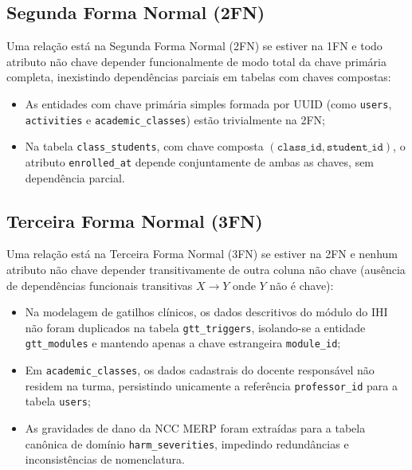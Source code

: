 \subsection{Segunda Forma Normal (2FN)}
Uma relação está na Segunda Forma Normal (2FN) se estiver na 1FN e todo atributo não chave depender funcionalmente de modo total da chave primária completa, inexistindo dependências parciais em tabelas com chaves compostas:
\begin{itemize}
    \item As entidades com chave primária simples formada por UUID (como \texttt{users}, \texttt{activities} e \texttt{academic\_classes}) estão trivialmente na 2FN;
    \item Na tabela \texttt{class\_students}, com chave composta $(\texttt{class\_id}, \texttt{student\_id})$, o atributo \texttt{enrolled\_at} depende conjuntamente de ambas as chaves, sem dependência parcial.
\end{itemize}

\subsection{Terceira Forma Normal (3FN)}
Uma relação está na Terceira Forma Normal (3FN) se estiver na 2FN e nenhum atributo não chave depender transitivamente de outra coluna não chave (ausência de dependências funcionais transitivas $X \rightarrow Y$ onde $Y$ não é chave):
\begin{itemize}
    \item Na modelagem de gatilhos clínicos, os dados descritivos do módulo do IHI não foram duplicados na tabela \texttt{gtt\_triggers}, isolando-se a entidade \texttt{gtt\_modules} e mantendo apenas a chave estrangeira \texttt{module\_id};
    \item Em \texttt{academic\_classes}, os dados cadastrais do docente responsável não residem na turma, persistindo unicamente a referência \texttt{professor\_id} para a tabela \texttt{users};
    \item As gravidades de dano da NCC MERP foram extraídas para a tabela canônica de domínio \texttt{harm\_severities}, impedindo redundâncias e inconsistências de nomenclatura.
\end{itemize}

